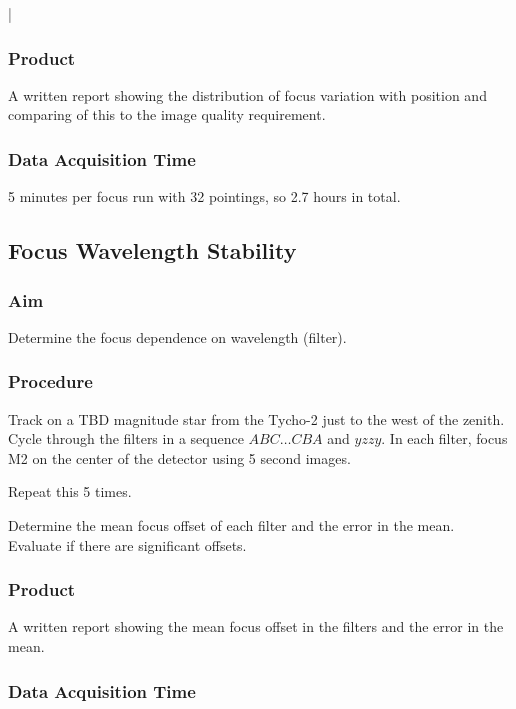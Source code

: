 |\documentclass{article}
\begin{document}
\subsubsection{Product}

A written report showing the distribution of focus variation with position and comparing of this to the image quality requirement.

\subsubsection{Data Acquisition Time}

5 minutes per focus run with 32 pointings, so 2.7 hours in total.


\subsection{Focus Wavelength Stability}

\subsubsection{Aim}

Determine the focus dependence on wavelength (filter).

\subsubsection{Procedure}

Track on a TBD magnitude star from the Tycho-2 just to the west of the zenith. Cycle through the filters in a sequence $ABC\ldots CBA$ and $yzzy$. In each filter, focus M2 on the center of the detector using 5 second images.

Repeat this 5 times.

Determine the mean focus offset of each filter and the error in the mean. Evaluate if there are significant offsets.


\subsubsection{Product}

A written report showing the mean focus offset in the filters and the error in the mean.

\subsubsection{Data Acquisition Time}
\end{document}

